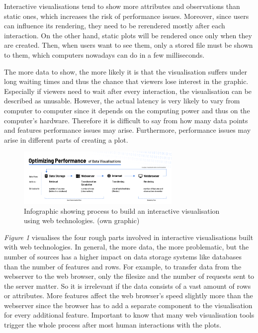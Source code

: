 \documentclass[11pt]{article}
\begin{document}
Interactive visualisations tend to show more attributes and observations than static ones, which increases the risk of performance issues. Moreover, since users can influence its rendering, they need to be rerendered mostly after each interaction. On the other hand, static plots will be rendered once only when they are created. Then, when users want to see them, only a stored file must be shown to them, which computers nowadays can do in a few milliseconds.

The more data to show, the more likely it is that the visualisation suffers under long waiting times and thus the chance that viewers lose interest in the graphic. Especially if viewers need to wait after every interaction, the visualisation can be described as unusable. However, the actual latency is very likely to vary from computer to computer since it depends on the computing power and thus on the computer's hardware. Therefore it is difficult to say from how many data points and features performance issues may arise. Furthermore, performance issues may arise in different parts of creating a plot.

\begin{figure}
    \centering
    \includegraphics[width=0.7\textwidth]{./performance.png}
    \caption{Infographic showing process to build an interactive visualisation using web technologies. (own graphic)}
\end{figure}

\textit{Figure 1} visualises the four rough parts involved in interactive visualisations built with web technologies. In general, the more data, the more problematic, but the number of sources has a higher impact on data storage systems like databases than the number of features and rows. For example, to transfer data from the webserver to the web browser, only the filesize and the number of requests sent to the server matter. So it is irrelevant if the data consists of a vast amount of rows or attributes. More features affect the web browser's speed slightly more than the webserver since the browser has to add a separate component to the visualisation for every additional feature. Important to know that many web visualisation tools trigger the whole process after most human interactions with the plots.
\end{document}

